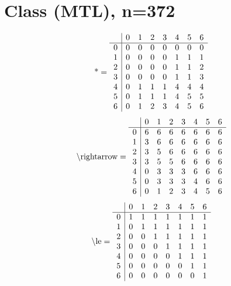 \documentclass[11pt]{article}
\begin{document}
\section{Class (MTL), n=372}
\[\text{*} = 
\begin{array}{r | r r r r r r r}
 & 0 & 1 & 2 & 3 & 4 & 5 & 6 \\ \hline
0 & 0 & 0 & 0 & 0 & 0 & 0 & 0 \\
1 & 0 & 0 & 0 & 0 & 1 & 1 & 1 \\
2 & 0 & 0 & 0 & 0 & 1 & 1 & 2 \\
3 & 0 & 0 & 0 & 0 & 1 & 1 & 3 \\
4 & 0 & 1 & 1 & 1 & 4 & 4 & 4 \\
5 & 0 & 1 & 1 & 1 & 4 & 5 & 5 \\
6 & 0 & 1 & 2 & 3 & 4 & 5 & 6 \\
\end{array}
\]
\[\text{\textbackslash rightarrow} = 
\begin{array}{r | r r r r r r r}
 & 0 & 1 & 2 & 3 & 4 & 5 & 6 \\ \hline
0 & 6 & 6 & 6 & 6 & 6 & 6 & 6 \\
1 & 3 & 6 & 6 & 6 & 6 & 6 & 6 \\
2 & 3 & 5 & 6 & 6 & 6 & 6 & 6 \\
3 & 3 & 5 & 5 & 6 & 6 & 6 & 6 \\
4 & 0 & 3 & 3 & 3 & 6 & 6 & 6 \\
5 & 0 & 3 & 3 & 3 & 4 & 6 & 6 \\
6 & 0 & 1 & 2 & 3 & 4 & 5 & 6 \\
\end{array}
\]
\[\text{\textbackslash le} = 
\begin{array}{r | r r r r r r r}
 & 0 & 1 & 2 & 3 & 4 & 5 & 6 \\ \hline
0 & 1 & 1 & 1 & 1 & 1 & 1 & 1 \\
1 & 0 & 1 & 1 & 1 & 1 & 1 & 1 \\
2 & 0 & 0 & 1 & 1 & 1 & 1 & 1 \\
3 & 0 & 0 & 0 & 1 & 1 & 1 & 1 \\
4 & 0 & 0 & 0 & 0 & 1 & 1 & 1 \\
5 & 0 & 0 & 0 & 0 & 0 & 1 & 1 \\
6 & 0 & 0 & 0 & 0 & 0 & 0 & 1 \\
\end{array}
\]
\end{document}

